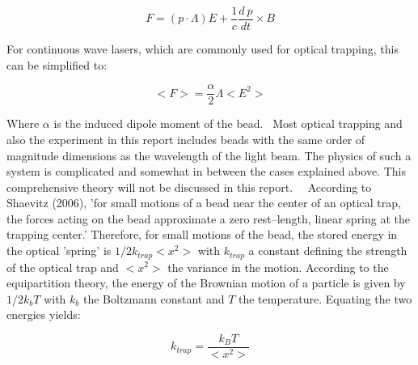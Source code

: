 \begin{equation}
	F  = (p \cdot \Lambda)E + \frac{1}{c} \frac{d\: p}{dt} \times B
\end{equation}

For continuous wave lasers, which are commonly used for optical trapping, this can be simplified to:

\begin{equation}
	\big< F \big>  = \frac{\alpha}{2} \Lambda \big< E^2 \big>
\end{equation}

Where $\alpha $ is the induced dipole moment of the bead.  \
Most optical trapping and also the experiment in this report includes beads with the same order of magnitude dimensions as the wavelength of the light beam. The physics of such a system is complicated and somewhat in between the cases explained above. This comprehensive theory will not be discussed in this report. \
\
According to Shaevitz (2006), 'for small motions of a bead near the center of an optical trap, the forces acting on the bead approximate a zero rest–length, linear spring at the trapping center.' Therefore, for small motions of the bead, the stored energy in the optical 'spring' is $1/2 k_{trap} <x^2>$ with $k_{trap}$ a constant defining the strength of the optical trap and $<x^2>$ the variance in the motion. According to the equipartition theory, the energy of the Brownian motion of a particle is given by $1/2 k_b T$ with $k_b$ the Boltzmann constant and $T$ the temperature.\cite{Shaevitz} Equating the two energies yields:

\begin{equation}
	\label{eq_k_trap}
	k_{trap} = \frac{k_B T}{<x^2>}
\end{equation}

